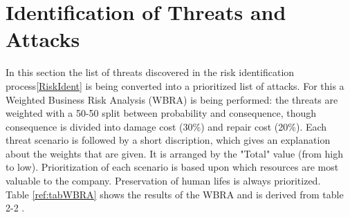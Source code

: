 \section{Identification of Threats and Attacks}\label{sec:IdentThreatsAttacks}
In this section the list of threats discovered in the risk identification process\ref{RiskIdent} is being converted into a prioritized list of attacks. For this a Weighted Business Risk Analysis (WBRA) is being performed: the threats are weighted with a 50-50 split between probability and consequence, though consequence is divided into damage cost (30\%) and repair cost (20\%). Each threat scenario is followed by a short discription, which gives an explanation about the weights that are given. It is arranged by the "Total" value (from high to low). Prioritization of each scenario is based upon which resources are most valuable to the company. Preservation of human lifes is always prioritized.\\
Table \ref{ref:tabWBRA} shows the results of the WBRA and is derived from table 2-2 \cite{whitman2}.\\

